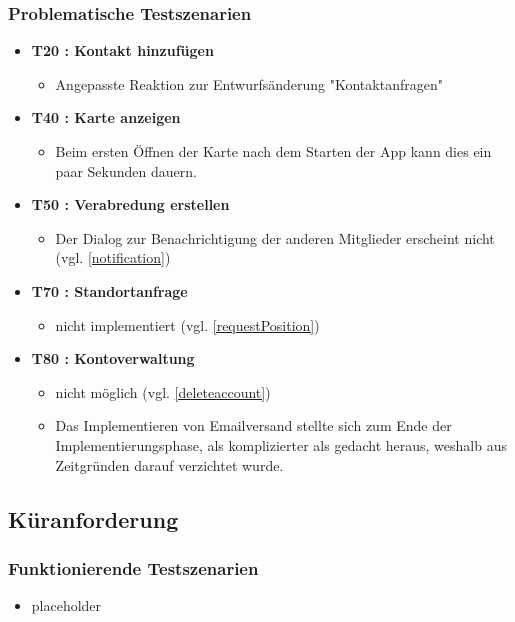 \documentclass[parskip=full,11pt]{scrartcl}
\begin{document}
		\subsubsection{Problematische Testszenarien}
			\begin{itemize}
				\item \textbf{T20 : Kontakt hinzufügen}
					\begin{itemize}
						\item Angepasste Reaktion zur Entwurfsänderung "Kontaktanfragen"
					\end{itemize}
				\item \textbf{T40 : Karte anzeigen}
					\begin{itemize}
						\item Beim ersten Öffnen der Karte nach dem Starten der App kann
									dies ein paar Sekunden dauern.
						\end{itemize}
				\item \textbf{T50 : Verabredung erstellen}
					\begin{itemize}
						\item Der Dialog zur Benachrichtigung der anderen
                            Mitglieder erscheint nicht (vgl. \ref{notification})
					\end{itemize}
				\item \textbf{T70 : Standortanfrage}
					\begin{itemize}
						\item nicht implementiert (vgl. \ref{requestPosition})
					\end{itemize}
				\item \textbf{T80 : Kontoverwaltung}
					\begin{itemize}
                        \item nicht möglich (vgl. \ref{deleteaccount})
          	            \item Das Implementieren von Emailversand stellte sich
                            zum Ende der Implementierungsphase, als
                            komplizierter als gedacht heraus, weshalb aus
                            Zeitgründen darauf verzichtet wurde.
					\end{itemize}
				\end{itemize}

	\subsection{Küranforderung}
		\subsubsection{Funktionierende Testszenarien}
			\begin{itemize}
				\item placeholder
	\end{itemize}
\end{document}
